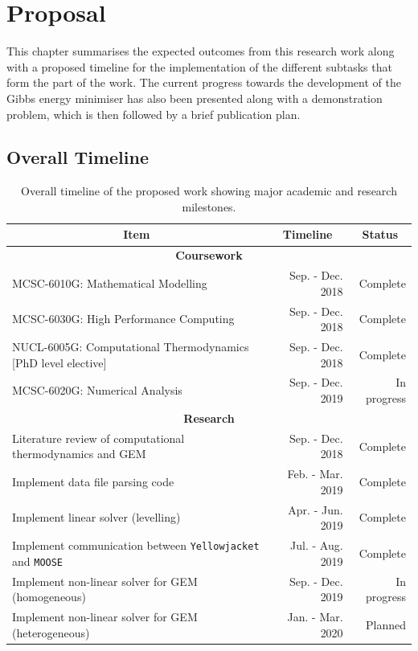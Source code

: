 \chapter{Proposal} \label{chapter_6}


	This chapter summarises the expected outcomes from this research work along with a proposed timeline for the implementation of the different subtasks that form the part of the work. The current progress towards the development of the Gibbs energy minimiser has also been presented along with a demonstration problem, which is then followed by a brief publication plan.

	
\section{Overall Timeline}
	\begin{table}[!htbp]
		\caption{Overall timeline of the proposed work showing major academic and research milestones.}
		\centering	
  		\begin{tabular}{@{}l r r@{}}
		\toprule
		\multicolumn{1}{c}{\textbf{Item}} & \multicolumn{1}{c}{\textbf{Timeline}} & \multicolumn{1}{c}{\textbf{Status}}\\
		\midrule
		\multicolumn{3}{c}{\textbf{Coursework}}\\
		\midrule
		MCSC-6010G: Mathematical Modelling & Sep. - Dec. 2018 & Complete\\
		MCSC-6030G: High Performance Computing & Sep. - Dec. 2018 & Complete\\
		NUCL-6005G: Computational Thermodynamics [PhD level elective] & Sep. - Dec. 2018 & Complete\\
		MCSC-6020G: Numerical Analysis & Sep. - Dec. 2019 & In progress\\
		\midrule
		\multicolumn{3}{c}{\textbf{Research}}\\
		\midrule
		Literature review of computational thermodynamics and GEM & Sep. - Dec. 2018 & Complete\\
		Implement data file parsing code & Feb. - Mar. 2019 & Complete\\
		Implement linear solver (levelling) & Apr. - Jun. 2019 & Complete\\
		Implement communication between \texttt{Yellowjacket} and \texttt{MOOSE} & Jul. - Aug. 2019 & Complete\\
		Implement non-linear solver for GEM (homogeneous) & Sep. - Dec. 2019 & In progress\\
		Implement non-linear solver for GEM (heterogeneous) & Jan. - Mar. 2020 & Planned\\

\end{tabular}
\end{table}
